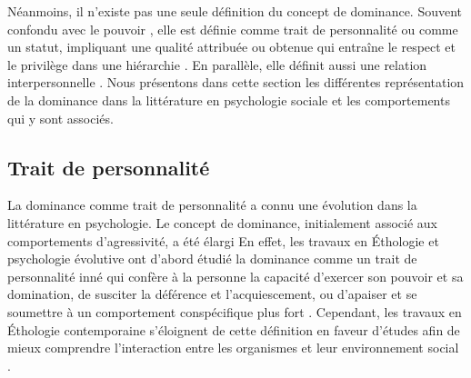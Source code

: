 	Néanmoins, il n'existe pas une seule définition du concept de dominance. Souvent confondu avec le pouvoir  \cite{burgoon2000interactionist,dunbar2005perceptions}, elle est définie comme trait de personnalité ou comme un statut, impliquant une qualité attribuée ou obtenue qui entraîne le respect et le privilège dans une hiérarchie \cite{hall2005nonverbal}. En parallèle, elle définit aussi une relation interpersonnelle \cite{burgoon2006nonverbal,burgoon1998nature}. Nous présentons dans cette section les différentes représentation de la dominance dans la littérature en psychologie sociale et les comportements qui y sont associés.  
	
\subsection{Trait de personnalité}


La dominance comme trait de personnalité a connu une évolution dans la littérature en psychologie. Le concept de dominance, initialement associé aux comportements d'agressivité, a été élargi \cite{burgoon1995interpersonal}
En effet, les travaux en Éthologie et psychologie évolutive ont d'abord étudié la dominance comme un trait de personnalité inné qui confère à la personne la capacité d'exercer son pouvoir et sa domination, de susciter la déférence et l'acquiescement, ou d'apaiser et se soumettre à un comportement conspécifique plus fort \cite{keltner1995signs,burgoon2006nonverbal}. Cependant, les travaux en Éthologie contemporaine s'éloignent de cette définition en faveur d'études afin de mieux comprendre l'interaction entre les organismes et leur environnement social \cite{burgoon2006nonverbal}.

